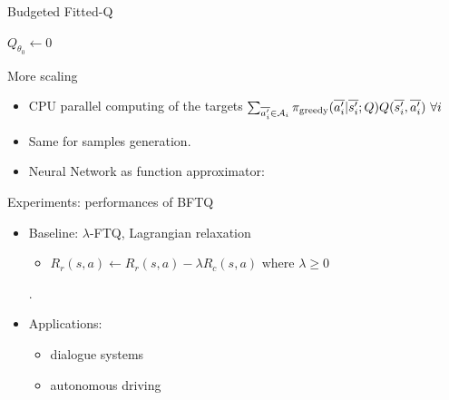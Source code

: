 \documentclass{beamer}
\begin{document}
    \begin{frame}{Budgeted Fitted-Q}
        \begin{algorithm}[H]
            \DontPrintSemicolon
            \KwData{$\cD$}
            $Q_{\theta_0} \leftarrow 0$\;
            \caption{Budgeted Fitted-Q Iteration}
        \end{algorithm}
    \end{frame}

    \begin{frame}{More scaling}

        \begin{itemize}
            \pause\item CPU parallel computing of the targets $\sum_{\ov{a'_i}\in \cA_i} \pi_\text{greedy}(\ov{a'_i}|\ov{s'_i}; Q) Q(\ov{s'_i}, \ov{a'_i})\ \forall i$
            \pause\item Same for samples generation.
            \pause\item Neural Network as function approximator: 
        \end{itemize}

        \begin{center}
            \resizebox{.7\textwidth}{!}{%
            
            }
        \end{center}

    \end{frame}




    \begin{frame}{Experiments: performances of BFTQ}
        \begin{itemize}
            \item Baseline: $\lambda$-FTQ, Lagrangian relaxation
            \begin{itemize}
                \item $R_r(s,a) \leftarrow R_r(s,a) - \lambda R_c(s,a) \text{ where } \lambda \geq 0$
            \end{itemize}.
            \item Applications:
            \begin{itemize}
                \item dialogue systems
                \item autonomous driving
            \end{itemize}
        \end{itemize}
    \end{frame}
\end{document}
